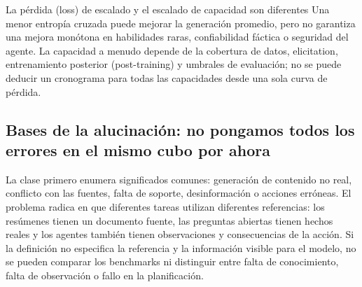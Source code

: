 


\begin{warningbox}{La pérdida (loss) de escalado y el escalado de capacidad son diferentes}
Una menor entropía cruzada puede mejorar la generación promedio, pero no garantiza una mejora monótona en habilidades raras, confiabilidad fáctica o seguridad del agente. La capacidad a menudo depende de la cobertura de datos, elicitation, entrenamiento posterior (post-training) y umbrales de evaluación; no se puede deducir un cronograma para todas las capacidades desde una sola curva de pérdida.
\end{warningbox}

\subsection{Bases de la alucinación: no pongamos todos los errores en el mismo cubo por ahora}

La clase primero enumera significados comunes: generación de contenido no real, conflicto con las fuentes, falta de soporte, desinformación o acciones erróneas. El problema radica en que diferentes tareas utilizan diferentes referencias: los resúmenes tienen un documento fuente, las preguntas abiertas tienen hechos reales y los agentes también tienen observaciones y consecuencias de la acción. Si la definición no especifica la referencia y la información visible para el modelo, no se pueden comparar los benchmarks ni distinguir entre falta de conocimiento, falta de observación o fallo en la planificación.



